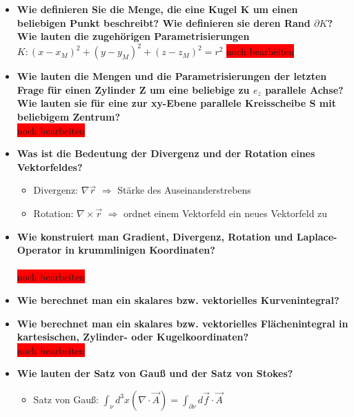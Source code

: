 \documentclass[german]{latex4ei/latex4ei_sheet}
\begin{document}
\begin{itemize}
		\item \textbf{Wie definieren Sie die Menge, die eine Kugel K um einen\\
		 beliebigen Punkt beschreibt? Wie definieren sie deren Rand $\partial K$? Wie lauten die zugehörigen Parametrisierungen}\\
		$K: (x−x_M)^2+(y−y_M)^2+(z−z_M)^2=r^2$
		\colorbox{red}{noch bearbeiten}
		\item \textbf{Wie lauten die Mengen und die Parametrisierungen der letzten Frage für einen Zylinder Z um eine beliebige zu $e_z$ parallele Achse? Wie lauten sie für eine zur xy-Ebene parallele Kreisscheibe S mit beliebigem Zentrum?}\\
		\colorbox{red}{noch bearbeiten}
		\item \textbf{Was ist die Bedeutung der Divergenz und der Rotation eines Vektorfeldes?}
			\begin{itemize}
				\item Divergenz: $\nabla\vec{r}$ $\Rightarrow$ Stärke des Auseinanderstrebens
				\item Rotation: $\nabla\times\vec{r}$ $\Rightarrow$ ordnet einem Vektorfeld ein neues Vektorfeld zu
			\end{itemize}
		\item \textbf{Wie konstruiert man Gradient, Divergenz, Rotation und Laplace-Operator in
krummlinigen Koordinaten?}\\
		\\\colorbox{red}{noch bearbeiten}
		\item \textbf{Wie berechnet man ein skalares bzw. vektorielles Kurvenintegral?}
		\begin{itemize}
			\item skalares Kurvenintegral: $\int_\gamma fds:=\int_a^bf(\gamma(t))\cdot|\dot{\gamma}(t)|dt$
			\item vektorielles Kurvenintegral: $\int_\gamma \vec{f}d\vec{s}:=\int_a^b\vec{f}(\vec{\gamma}}(t))\cdot|\dot{\vec{\gamma}}(t)|dt$
		\end{itemize}
		\item \textbf{Wie berechnet man ein skalares bzw. vektorielles Flächenintegral in kartesischen, Zylinder- oder Kugelkoordinaten?}
		\\\colorbox{red}{noch bearbeiten}
		\item \textbf{Wie lauten der Satz von Gauß und der Satz von Stokes?}
			\begin{itemize}
				\item Satz von Gauß: $\int_\nu d^3x(\nabla\cdot\vec{A})=\int_{\partial\nu}d\vec{f}\cdot\vec{A}$

\end{itemize}
\end{itemize}
\end{document}
